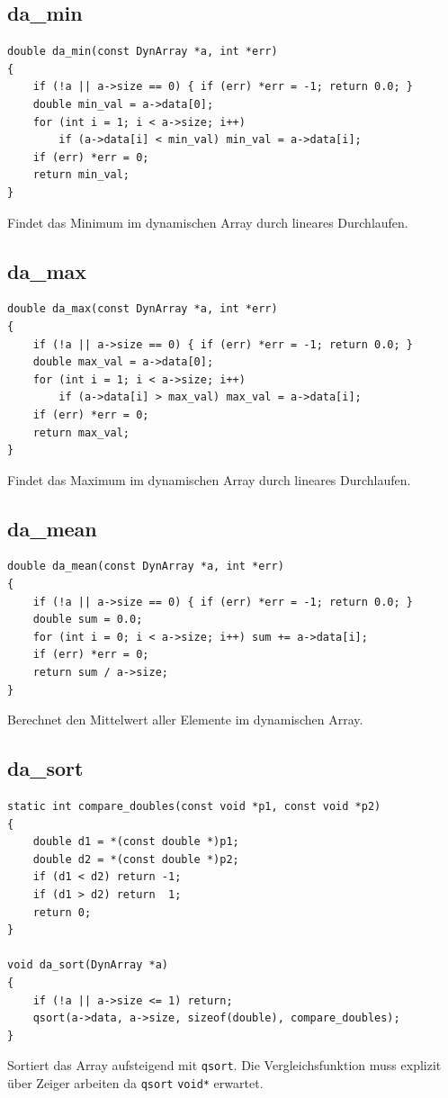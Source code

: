 \documentclass[10pt, a4paper]{article}
\begin{document}
\subsection{da\_min}
\begin{lstlisting}
double da_min(const DynArray *a, int *err)
{
    if (!a || a->size == 0) { if (err) *err = -1; return 0.0; }
    double min_val = a->data[0];
    for (int i = 1; i < a->size; i++)
        if (a->data[i] < min_val) min_val = a->data[i];
    if (err) *err = 0;
    return min_val;
}
\end{lstlisting}
Findet das Minimum im dynamischen Array durch lineares Durchlaufen.

\subsection{da\_max}
\begin{lstlisting}
double da_max(const DynArray *a, int *err)
{
    if (!a || a->size == 0) { if (err) *err = -1; return 0.0; }
    double max_val = a->data[0];
    for (int i = 1; i < a->size; i++)
        if (a->data[i] > max_val) max_val = a->data[i];
    if (err) *err = 0;
    return max_val;
}
\end{lstlisting}
Findet das Maximum im dynamischen Array durch lineares Durchlaufen.

\subsection{da\_mean}
\begin{lstlisting}
double da_mean(const DynArray *a, int *err)
{
    if (!a || a->size == 0) { if (err) *err = -1; return 0.0; }
    double sum = 0.0;
    for (int i = 0; i < a->size; i++) sum += a->data[i];
    if (err) *err = 0;
    return sum / a->size;
}
\end{lstlisting}
Berechnet den Mittelwert aller Elemente im dynamischen Array.

\subsection{da\_sort}
\begin{lstlisting}
static int compare_doubles(const void *p1, const void *p2)
{
    double d1 = *(const double *)p1;
    double d2 = *(const double *)p2;
    if (d1 < d2) return -1;
    if (d1 > d2) return  1;
    return 0;
}

void da_sort(DynArray *a)
{
    if (!a || a->size <= 1) return;
    qsort(a->data, a->size, sizeof(double), compare_doubles);
}
\end{lstlisting}
Sortiert das Array aufsteigend mit \texttt{qsort}. Die Vergleichsfunktion muss explizit \"uber Zeiger arbeiten da \texttt{qsort} \texttt{void*} erwartet.
\end{document}
